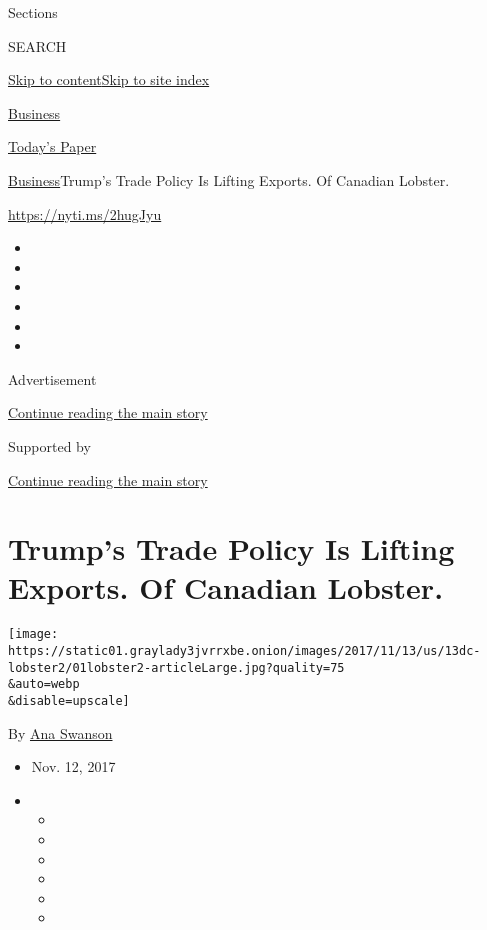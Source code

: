 Sections

SEARCH

\protect\hyperlink{site-content}{Skip to
content}\protect\hyperlink{site-index}{Skip to site index}

\href{https://www.nytimes3xbfgragh.onion/section/business}{Business}

\href{https://myaccount.nytimes3xbfgragh.onion/auth/login?response_type=cookie\&client_id=vi}{}

\href{https://www.nytimes3xbfgragh.onion/section/todayspaper}{Today's
Paper}

\href{/section/business}{Business}\textbar{}Trump's Trade Policy Is
Lifting Exports. Of Canadian Lobster.

\url{https://nyti.ms/2hugJyu}

\begin{itemize}
\item
\item
\item
\item
\item
\item
\end{itemize}

Advertisement

\protect\hyperlink{after-top}{Continue reading the main story}

Supported by

\protect\hyperlink{after-sponsor}{Continue reading the main story}

\hypertarget{trumps-trade-policy-is-lifting-exports-of-canadian-lobster}{%
\section{Trump's Trade Policy Is Lifting Exports. Of Canadian
Lobster.}\label{trumps-trade-policy-is-lifting-exports-of-canadian-lobster}}

\texttt{[image: https://static01.graylady3jvrrxbe.onion/images/2017/11/13/us/13dc-lobster2/01lobster2-articleLarge.jpg?quality=75\\\&auto=webp\\\&disable=upscale]}

By \href{https://www.nytimes3xbfgragh.onion/by/ana-swanson}{Ana Swanson}

\begin{itemize}
\item
  Nov. 12, 2017
\item
  \begin{itemize}
  \item
  \item
  \item
  \item
  \item
  \item
  \end{itemize}
\end{itemize}

